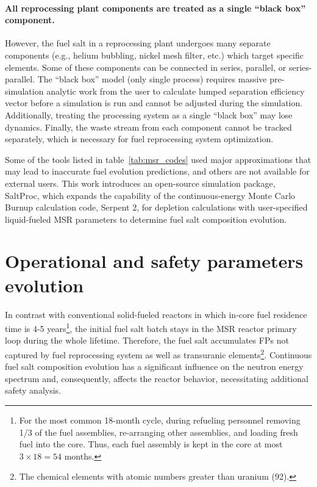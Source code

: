 \paragraph{All reprocessing plant components are treated as a single ``black 
	box'' component.} However, the fuel salt in a reprocessing plant undergoes 
many separate components (e.g., helium bubbling, nickel mesh filter, etc.) 
which target specific elements. Some of these components can be connected in 
series, parallel, or series-parallel. The ``black box'' model (only single 
process) requires massive pre-simulation analytic work from the user to 
calculate lumped separation efficiency vector before a simulation is run and 
cannot be adjusted during the simulation. Additionally, treating the 
processing system as a single ``black box'' may lose dynamics. Finally, the 
waste stream from each component cannot be tracked separately, which is 
necessary for fuel reprocessing system optimization.

Some of the tools listed in table~\ref{tab:msr_codes} used major 
approximations that may lead to inaccurate fuel evolution predictions, and 
others are not available for external users. This work introduces an 
open-source simulation package, SaltProc, which expands the capability of the 
continuous-energy Monte Carlo Burnup calculation code, Serpent 2, for 
depletion calculations with user-specified liquid-fueled \gls{MSR} parameters 
to determine fuel salt composition evolution.

\section{Operational and safety parameters evolution} 
\label{sec:saf-par-literature}
In contrast with conventional solid-fueled reactors in which in-core fuel 
residence time is 4-5 years\footnote{For the most common 
	18-month cycle, during refueling personnel removing 1/3 of the fuel 
	assemblies, re-arranging other assemblies, and loading fresh fuel into the 
	core. Thus, each fuel assembly is kept in the core at most $3\times 18=54$ 
	months.}, the initial fuel salt batch stays in the \gls{MSR} reactor 
	primary 
loop during the whole lifetime. Therefore, the fuel salt accumulates 
\glspl{FP} not captured by fuel reprocessing system as well as transuranic 
elements\footnote{The chemical elements with atomic numbers greater than 
	uranium (92).}. Continuous fuel salt composition evolution has a 
significant influence on the neutron energy spectrum and, consequently, 
affects the reactor behavior, necessitating additional safety analysis.

